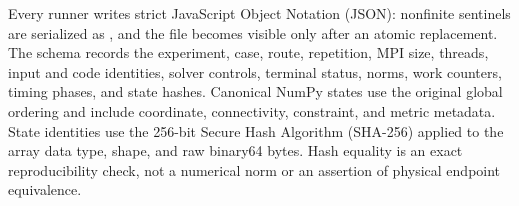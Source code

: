 Every runner writes strict JavaScript Object Notation (JSON): nonfinite
sentinels are serialized as
, and the file becomes visible only after an atomic replacement.
The schema records the experiment, case, route, repetition, MPI size, threads,
input and code identities, solver controls, terminal status, norms, work
counters, timing phases, and state hashes. Canonical NumPy  states
use the original global ordering and include coordinate, connectivity,
constraint, and metric metadata. State identities use the 256-bit Secure Hash
Algorithm (SHA-256) applied to the array data type, shape, and raw binary64
bytes. Hash equality is an exact reproducibility check, not a numerical norm or
an assertion of physical endpoint equivalence.
